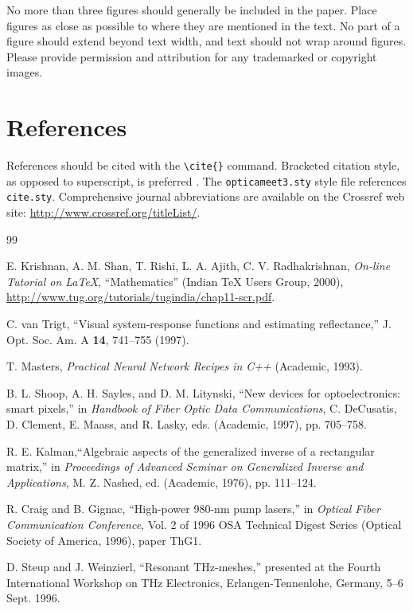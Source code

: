 \documentclass{article}
\begin{document}
No more than three figures should generally be included in the paper. Place figures as close as possible to where they
are mentioned in the text. No part of a figure should extend beyond text width, and text should not wrap around figures. Please provide permission and attribution for any trademarked or copyright images.

\section{References}
References should be cited with the \verb+\cite{}+ command.
Bracketed citation style, as opposed to superscript, is preferred
\cite{krishnan00,vantrigt97,masters93,shoop97,kalman76,craig96,steup96}.
The \texttt{opticameet3.sty} style file references \texttt{cite.sty}. Comprehensive journal abbreviations are available on the Crossref web site:
\href{http://www.crossref.org/titleList/}{http://www.crossref.org/titleList/}.

\begin{thebibliography}{99} %



 E. Krishnan, A. M. Shan, T. Rishi, L. A. Ajith, C. V.
Radhakrishnan, \textit{On-line Tutorial on \LaTeX{}},
``Mathematics'' (Indian \TeX{} Users Group, 2000), \\
\url{http://www.tug.org/tutorials/tugindia/chap11-scr.pdf}.

 C. van Trigt, ``Visual system-response functions and estimating reflectance,''
J. Opt. Soc. Am. A \textbf{14}, 741--755 (1997).

 T. Masters, \emph{Practical Neural Network Recipes in C++} (Academic, 1993).

 B. L. Shoop, A. H. Sayles, and D. M. Litynski, ``New devices for optoelectronics: smart pixels,''
in \emph{Handbook of Fiber Optic Data Communications},
C. DeCusatis, D. Clement, E. Maass, and R. Lasky, eds. (Academic, 1997), pp. 705--758.

 R. E. Kalman,``Algebraic aspects of the generalized inverse of a rectangular matrix,'' in
\emph{Proceedings of Advanced Seminar on Generalized Inverse and Applications}, M. Z. Nashed, ed. (Academic, 1976), pp. 111--124.

 R. Craig and B. Gignac, ``High-power 980-nm pump lasers,''
in \emph{Optical Fiber Communication Conference}, Vol. 2 of 1996 OSA Technical Digest Series (Optical Society of America, 1996), paper ThG1.

 D. Steup and J. Weinzierl, ``Resonant THz-meshes,''
presented at the Fourth International Workshop on THz Electronics, Erlangen-Tennenlohe, Germany, 5--6 Sept. 1996.

\end{thebibliography}
\end{document}
